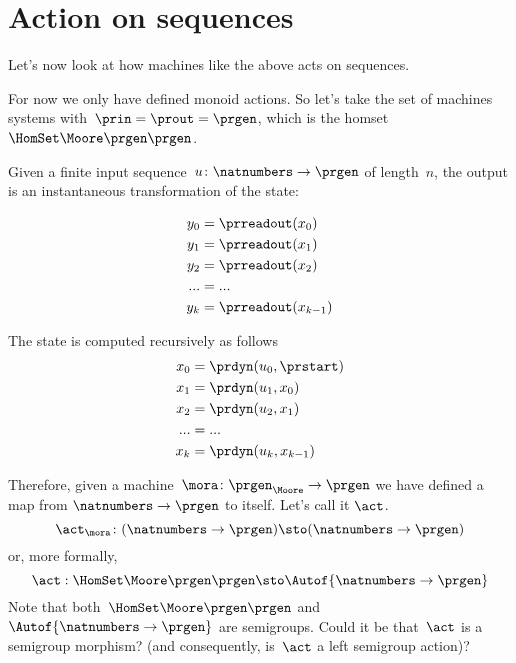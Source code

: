\section{Action on sequences}

Let's now look at how machines like the above acts on sequences. 

For now we only have defined monoid actions. So let's take the set of machines systems with~$\prin = \prout = \prgen$, which is the homset~$\HomSet\Moore\prgen\prgen$.

Given a finite input sequence~$u\colon \natnumbers \to \prgen$ of length~$n$, the output is an instantaneous transformation of the state:

\begin{equation}
  \begin{aligned}
  y_0 &= \prreadout(x_0) \\ 
  y_1 &= \prreadout(x_1) \\ 
  y_2 &= \prreadout(x_2) \\ 
  ... &= ...  \\
  y_{k} &= \prreadout(x_{k-1}) 
\end{aligned} 
\end{equation}

The state is computed recursively as follows 
\begin{equation}
  \begin{aligned}
  x_0 &= \prdyn(u_0, \prstart) \\ 
  x_1 &= \prdyn(u_1, x_0) \\ 
  x_2 &= \prdyn(u_2, x_1) \\ 
  ... &= ... \\
  x_{k} &= \prdyn(u_{k}, x_{k-1}) 
  \end{aligned}
\end{equation}

Therefore, given a machine~$\mora \colon \prgen_{\Moore} \to \prgen$ we have defined a map from $\natnumbers \to \prgen$ to itself. Let's call it $\act$.
% 
\begin{equation}
\act_{\mora}\colon  (\natnumbers \to \prgen)  \sto  (\natnumbers \to \prgen)
\end{equation}
% 
or, more formally,
% 
  \begin{equation}
    \act: \HomSet\Moore\prgen\prgen \sto \Autof {\natnumbers \to \prgen}
\end{equation}
%
Note that both~$\HomSet\Moore\prgen\prgen$ and $\Autof {\natnumbers \to \prgen}$ are semigroups.
Could it be that~$\act$ is a semigroup morphism? (and consequently, is~$\act$ a left semigroup action)?

